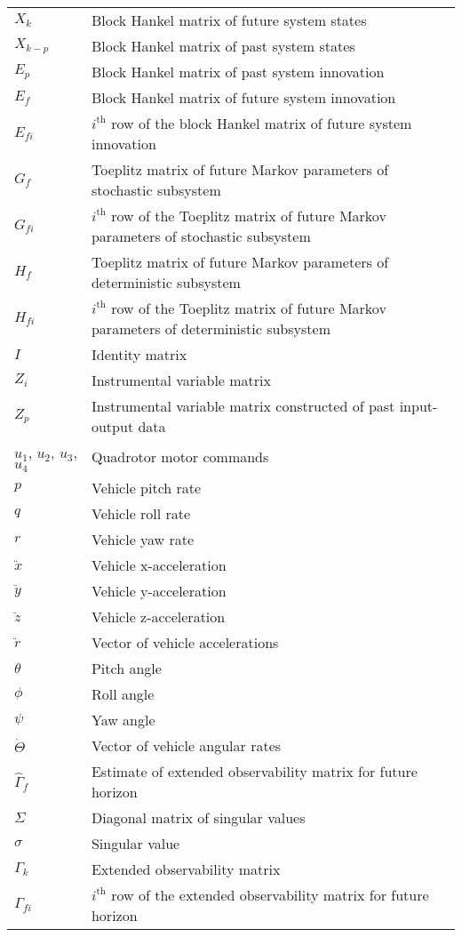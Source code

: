 {\begin{longtable}{p{7em}p{26em}}
$X_k$				& Block Hankel matrix of future system states\\
$X_{k-p}$			& Block Hankel matrix of past system states\\
$E_p$				& Block Hankel matrix of past system innovation\\
$E_f$				& Block Hankel matrix of future system innovation\\
$E_{fi}$			& $i^{\mbox{th}}$ row of the block Hankel matrix of future system innovation\\
$G_f$				& Toeplitz matrix of future Markov parameters of stochastic subsystem\\
$G_{fi}$			& $i^{\mbox{th}}$ row of the Toeplitz matrix of future Markov parameters of stochastic subsystem\\
$H_f$				& Toeplitz matrix of future Markov parameters of deterministic subsystem\\
$H_{fi}$			& $i^{\mbox{th}}$ row of the Toeplitz matrix of future Markov parameters of deterministic subsystem\\
$I$					& Identity matrix\\
$Z_i$				& Instrumental variable matrix\\
$Z_p$				& Instrumental variable matrix constructed of past input-output data\\
$u_1$, $u_2$, $u_3$, $u_4$	& Quadrotor motor commands\\
$p$					& Vehicle pitch rate \\
$q$					& Vehicle roll rate \\
$r$					& Vehicle yaw rate \\
$\ddot x$			& Vehicle x-acceleration \\
$\ddot y$			& Vehicle y-acceleration \\
$\ddot z$			& Vehicle z-acceleration \\
$\ddot r$			& Vector of vehicle accelerations\\

$\theta$					& Pitch angle\\
$\phi$						& Roll angle\\
$\psi$						& Yaw angle\\
$\dot \Theta$		& Vector of vehicle angular rates \\
$\hat{\Gamma}_f$	& Estimate of extended observability matrix for future horizon\\
$\Sigma$			& Diagonal matrix of singular values\\
$\sigma$			& Singular value\\
$\Gamma_k$			& Extended observability matrix\\
$\Gamma_{fi}$		& $i^{\mbox{th}}$ row of the extended observability matrix for future horizon\\

\end{longtable}

}